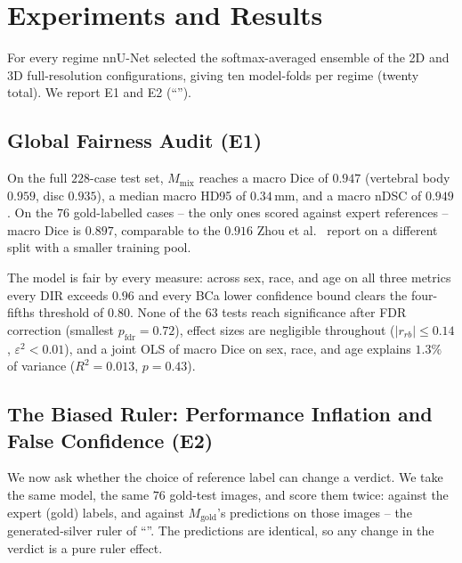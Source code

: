 \section{Experiments and Results}

For every regime nnU-Net selected the softmax-averaged ensemble of the 2D and 3D
full-resolution configurations, giving ten model-folds per regime (twenty total).
We report E1 and E2 (``'').

\subsection{Global Fairness Audit (E1)}
\label{sec:global}

On the full $228$-case test set, $M_{\mathrm{mix}}$ reaches a macro Dice of $0.947$
(vertebral body $0.959$, disc $0.935$), a median macro HD95 of $0.34$\,mm, and a
macro nDSC of $0.949$. On the $76$ gold-labelled cases -- the only ones
scored against expert references -- macro Dice is $0.897$, comparable to the $0.916$
Zhou et al.~\cite{zhou2025cspineseg} report on a different split with a smaller
training pool.

The model is fair by every measure: across sex, race, and age on all three metrics
every DIR exceeds $0.96$ and every BCa lower confidence bound clears the four-fifths
threshold of $0.80$.
None of the $63$ tests reach significance after FDR
correction (smallest $p_{\mathrm{fdr}} = 0.72$), effect sizes are negligible
throughout ($|r_{rb}| \le 0.14$, $\varepsilon^2 < 0.01$), and a joint OLS of macro
Dice on sex, race, and age explains $1.3\%$ of variance ($R^2 = 0.013$, $p = 0.43$).

\subsection{The Biased Ruler: Performance Inflation and False Confidence (E2)}
\label{sec:biased_ruler}

We now ask whether the choice of reference label can change a verdict. We take the
same model, the same $76$ gold-test images, and score them twice: against the
expert (gold) labels, and against $M_{\mathrm{gold}}$'s predictions on those images
-- the generated-silver ruler of ``''. The predictions are
identical, so any change in the verdict is a pure ruler effect.

